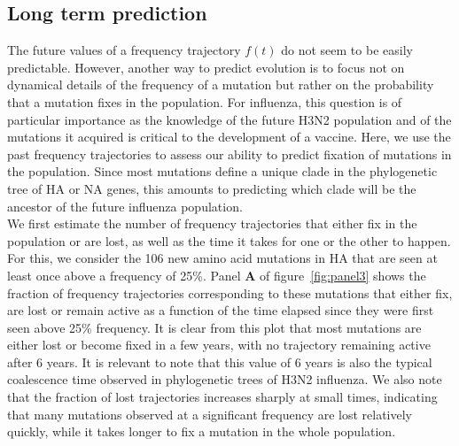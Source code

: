 \documentclass{article}
\begin{document}
	\subsection*{Long term prediction}

	The future values of a frequency trajectory $f(t)$ do not seem to be easily predictable. However, another way to predict evolution is to focus not on dynamical details of the frequency of a mutation but rather on the probability that a mutation fixes in the population. For influenza, this question is of particular importance as the knowledge of the future H3N2 population and of the mutations it acquired is critical to the development of a vaccine. Here, we use the past frequency trajectories to assess our ability to predict fixation of mutations in the population. Since most mutations define a unique clade in the phylogenetic tree of HA or NA genes, this amounts to predicting which clade will be the ancestor of the future influenza population. \\
	We first estimate the number of frequency trajectories that either fix in the population or are lost, as well as the time it takes for one or the other to happen. For this, we consider the 106 new amino acid mutations in HA that are seen at least once above a frequency of 25\%. Panel \textbf{A} of figure~\ref{fig:panel3} shows the fraction of frequency trajectories corresponding to these mutations that either fix, are lost or remain active as a function of the time elapsed since they were first seen above 25\% frequency. It is clear from this plot that most mutations are either lost or become fixed in a few years, with no trajectory remaining active after 6 years. It is relevant to note that this value of 6 years is also the typical coalescence time observed in phylogenetic trees of H3N2 influenza. We also note that the fraction of lost trajectories increases sharply at small times, indicating that many mutations observed at a significant frequency are lost relatively quickly, while it takes longer to fix a mutation in the whole population. \\
\end{document}

